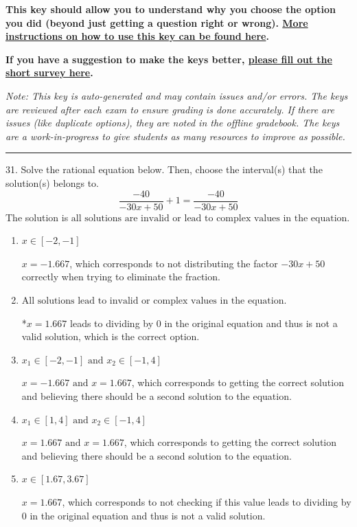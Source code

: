 \documentclass{extbook}[14pt]
\begin{document}
\textbf{This key should allow you to understand why you choose the option you did (beyond just getting a question right or wrong). \href{https://xronos.clas.ufl.edu/mac1105spring2020/courseDescriptionAndMisc/Exams/LearningFromResults}{More instructions on how to use this key can be found here}.}

\textbf{If you have a suggestion to make the keys better, \href{https://forms.gle/CZkbZmPbC9XALEE88}{please fill out the short survey here}.}

\textit{Note: This key is auto-generated and may contain issues and/or errors. The keys are reviewed after each exam to ensure grading is done accurately. If there are issues (like duplicate options), they are noted in the offline gradebook. The keys are a work-in-progress to give students as many resources to improve as possible.}

\rule{\textwidth}{0.4pt}

31. Solve the rational equation below. Then, choose the interval(s) that the solution(s) belongs to.
\[ \frac{-40}{-30x + 50} + 1 = \frac{-40}{-30x + 50} \] 
The solution is $ \text{all solutions are invalid or lead to complex values in the equation.} $ 

\begin{enumerate}[label=\Alph*.] 
\item $ x \in [-2,-1] $ 

 $x = -1.667$, which corresponds to not distributing the factor $-30x + 50$ correctly when trying to eliminate the fraction. 
\item $ \text{All solutions lead to invalid or complex values in the equation.} $ 

 *$x = 1.667$ leads to dividing by 0 in the original equation and thus is not a valid solution, which is the correct option. 
\item $ x_1 \in [-2, -1] \text{ and } x_2 \in [-1,4] $ 

 $x = -1.667 \text{ and } x = 1.667$, which corresponds to getting the correct solution and believing there should be a second solution to the equation. 
\item $ x_1 \in [1, 4] \text{ and } x_2 \in [-1,4] $ 

 $x = 1.667 \text{ and } x = 1.667$, which corresponds to getting the correct solution and believing there should be a second solution to the equation. 
\item $ x \in [1.67,3.67] $ 

 $x = 1.667$, which corresponds to not checking if this value leads to dividing by 0 in the original equation and thus is not a valid solution. 
\end{enumerate} 
 
\end{document}

